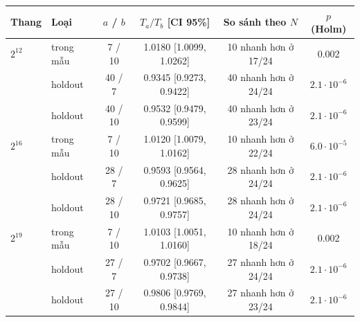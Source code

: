 \begin{tabular}{llcccc}
\toprule
Thang & Loại & $a$ / $b$ & $T_a/T_b$ [CI 95\%] & So sánh theo $N$ & $p$ (Holm) \\
\midrule
$2^{12}$ & trong mẫu & 7 / 10 & 1.0180 [1.0099, 1.0262] & 10 nhanh hơn ở 17/24 & 0.002 \\
 & holdout & 40 / 7 & 0.9345 [0.9273, 0.9422] & 40 nhanh hơn ở 24/24 & $2.1\cdot10^{-6}$ \\
 & holdout & 40 / 10 & 0.9532 [0.9479, 0.9599] & 40 nhanh hơn ở 23/24 & $2.1\cdot10^{-6}$ \\
\addlinespace
$2^{16}$ & trong mẫu & 7 / 10 & 1.0120 [1.0079, 1.0162] & 10 nhanh hơn ở 22/24 & $6.0\cdot10^{-5}$ \\
 & holdout & 28 / 7 & 0.9593 [0.9564, 0.9625] & 28 nhanh hơn ở 24/24 & $2.1\cdot10^{-6}$ \\
 & holdout & 28 / 10 & 0.9721 [0.9685, 0.9757] & 28 nhanh hơn ở 24/24 & $2.1\cdot10^{-6}$ \\
\addlinespace
$2^{19}$ & trong mẫu & 7 / 10 & 1.0103 [1.0051, 1.0160] & 10 nhanh hơn ở 18/24 & 0.002 \\
 & holdout & 27 / 7 & 0.9702 [0.9667, 0.9738] & 27 nhanh hơn ở 24/24 & $2.1\cdot10^{-6}$ \\
 & holdout & 27 / 10 & 0.9806 [0.9769, 0.9844] & 27 nhanh hơn ở 23/24 & $2.1\cdot10^{-6}$ \\
\bottomrule
\end{tabular}
